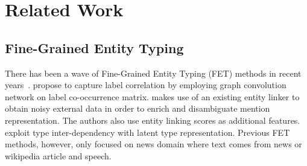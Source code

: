 

\section{Related Work}





\subsection{Fine-Grained Entity Typing}
There has been a wave of Fine-Grained Entity Typing (FET) methods in recent years~\cite{ultrafet, label_bias, fet_el, lin2019attentive,hierarchical_gcn, hyperbolic}. \citet{label_bias} propose to capture label correlation by employing graph convolution network on label co-occurrence matrix. \citet{fet_el} makes %
use of an existing entity linker to obtain noisy external data in order to enrich and disambiguate mention representation. The authors also use entity linking scores as additional features. \citet{lin2019attentive} exploit type inter-dependency with latent type representation. Previous FET methods, however, only focused on news domain where text comes from news or wikipedia article and speech.  


